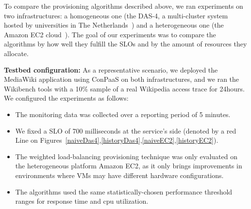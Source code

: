 To compare the provisioning algorithms described above, we ran experiments
on two infrastructures: a homogeneous one (the DAS-4, a multi-cluster system
hosted by universities in The Netherlands~\cite{das4}) and a heterogeneous
one (the Amazon EC2 cloud~\cite{amazonEC2}). The goal of our experiments
was to compare the algorithms by how well they fulfill the SLOs and by
the amount of resources they allocate.



\textbf{Testbed configuration:}  As a representative scenario, we deployed the MediaWiki application using ConPaaS on both infrastructures, and we ran the Wikibench tools with a 10\% sample of a real Wikipedia access trace for 24hours. 
We configured the experiments as follows:

\begin{itemize}

\item The monitoring data was collected over a reporting period of 5 minutes.

\item We fixed a SLO of 700 milliseconds at the service's side (denoted by a red Line on Figures~\ref{naiveDas4},\ref{historyDas4},\ref{naiveEC2},\ref{historyEC2}).


\item The weighted load-balancing provisioning technique was only evaluated on the heterogeneous platform Amazon EC2, as it only brings improvements in environments where VMs may have different hardware configurations. 

\item The algorithms used the same statistically-chosen performance threshold ranges for response time and cpu utilization. 

\end{itemize}


